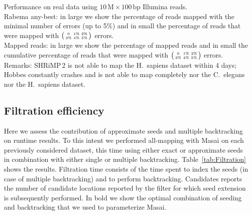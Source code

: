 \begin{table*}[t]
  \caption[Masai performance on real data]{
    \label{tab:Runtime}
    Performance on real data using $10\,\text{M}\times 100\,\text{bp}$ Illumina reads.\\
	Rabema any-best: in large we show the percentage of reads mapped with the minimal number of errors (up to 5\%) and in small the percentage of reads that were mapped with $\bigl(\begin{smallmatrix}\mbox{\tiny 0}&\mbox{\tiny 1\%}&\mbox{\tiny 2\%}\\\mbox{\tiny 3\%}&\mbox{\tiny 4\%}&\mbox{\tiny 5\%}\end{smallmatrix}\bigr)$ errors.\\
	Mapped reads: in large we show the percentage of mapped reads and in small the cumulative percentage of reads that were mapped with $\bigl(\begin{smallmatrix}\mbox{\tiny 0}&\mbox{\tiny 1\%}&\mbox{\tiny 2\%}\\\mbox{\tiny 3\%}&\mbox{\tiny 4\%}&\mbox{\tiny 5\%}\end{smallmatrix}\bigr)$ errors.\\
	Remarks:
    SHRiMP\,2 is not able to map the H.~sapiens dataset within 4 days;
    Hobbes constantly crashes and is not able to map completely nor the C.~elegans nor the H.~sapiens dataset.
  }
	\vspace{-3mm}
	\center
	\sffamily
	\resizebox{1.0\textwidth}{!}
	{
		\renewcommand{\tabcolsep}{0.8ex}
		
	}
\end{table*}


\subsection{Filtration efficiency}

Here we assess the contribution of approximate seeds and multiple backtracking on runtime results.
To this intent we performed all-mapping with Masai on each previously considered dataset, this time using either exact or approximate seeds in combination with either single or multiple backtracking.
Table~\ref{tab:Filtration} shows the results.
Filtration time consists of the time spent to index the seeds (in case of multiple backtracking) and to perform backtracking.
Candidates reports the number of candidate locations reported by the filter for which seed extension is subsequently performed.
In bold we show the optimal combination of seeding and backtracking that we used to parameterize Masai.


